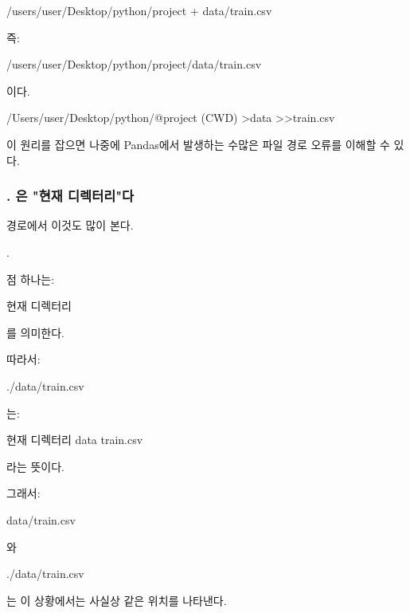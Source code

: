 \begin{dhksmry}[centered]
/users/user/Desktop/python/project
+
data/train.csv
\end{dhksmry}

즉:

\begin{dhkzsh}
/users/user/Desktop/python/project/data/train.csv
\end{dhkzsh}

이다.

\begin{dhkdir}
/Users/user/Desktop/python/@project (CWD)
>data
>>train.csv
\end{dhkdir}

이 원리를 잡으면 나중에 Pandas에서 발생하는 수많은 파일 경로 오류를 이해할 수 있다.

\subsubsection{. 은 "현재 디렉터리"다}

경로에서 이것도 많이 본다.

\begin{dhkzsh}
.
\end{dhkzsh}

점 하나는:

\begin{dhksmry}[centered]
현재 디렉터리
\end{dhksmry}

를 의미한다.

따라서:

\begin{dhkzsh}
./data/train.csv
\end{dhkzsh}

는:

\begin{dhksmry}[centered]
현재 디렉터리
\da
data
\da
train.csv
\end{dhksmry}

라는 뜻이다.

그래서:

\begin{dhkzsh}
data/train.csv
\end{dhkzsh}

와

\begin{dhkzsh}
./data/train.csv
\end{dhkzsh}

는 이 상황에서는 사실상 같은 위치를 나타낸다.

